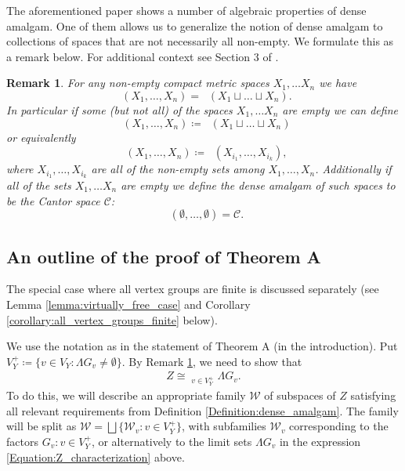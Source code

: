 \documentclass[12pt, a4paper]{article}
\newcommand{\8}{\infty}
\theoremstyle{break}
\newtheorem{rk}[thm]{Remark}
\theoremstyle{defbreak}
\DeclareMathOperator*{\damalgam}{\widetilde{\bigsqcup}}
\begin{document}
The aforementioned paper shows a number of algebraic properties of dense amalgam. One of them allows us to generalize the notion of dense amalgam to collections of spaces that are not necessarily all non-empty. We formulate this as a remark below. For additional context see Section $3$ of \cite{dense-amalgam}.\medskip

\begin{rk} \label{Remark:definition_of_dense_amalgam}
    For any non-empty compact metric spaces $X_1, \ldots X_n$ we have
    $$\damalgam(X_1,\ldots, X_n) = \damalgam(X_1\sqcup\ldots\sqcup X_n).$$
    In particular if some (but not all) of the spaces $X_1, \ldots X_n$ are empty we can define
    $$\damalgam(X_1,\ldots,X_n) \coloneqq \damalgam(X_1\sqcup\ldots\sqcup X_n)$$
    or equivalently 
    $$\damalgam(X_1,\ldots,X_n) \coloneqq \damalgam(X_{i_1},\ldots,X_{i_k}),$$
    where $X_{i_1},\ldots,X_{i_k}$ are all of the non-empty sets among $X_1,\ldots,X_n$. Additionally if all of the sets $X_1,\ldots X_n$ are empty we define the dense amalgam of such spaces to be the Cantor space $\mathcal{C}$:
    $$\damalgam(\emptyset,\ldots,\emptyset) = \mathcal{C}.$$
\end{rk}


\subsection{An outline of the proof of Theorem A}\label{Subsection:outline_of_proof}

The special case where all vertex groups are finite is discussed separately (see Lemma \ref{lemma:virtually_free_case} and Corollary  \ref{corollary:all_vertex_groups_finite} below). 


We use the notation as in the statement of Theorem A (in the introduction). Put $V_Y^+\coloneqq\{ v\in V_Y:\Lambda G_v\ne\emptyset \}$. By Remark \ref{Remark:definition_of_dense_amalgam},
we need to show that 
\begin{align}
Z\cong\damalgam_{v\in V_Y^+}\Lambda G_v. \label{Equation:Z_characterization}\tag{$*$}
\end{align}
To do this, we will describe an appropriate family $\mathcal{W}$
of subspaces of $Z$ satisfying all relevant requirements
from Definition \ref{Definition:dense_amalgam}. The family will be split as
$\mathcal{W}=\bigsqcup\{ \mathcal{W}_v:v\in V_Y^+ \}$,
with subfamilies $\mathcal{W}_v$ corresponding
to the factors $G_v:v\in V_Y^+$, or alternatively
to the limit sets $\Lambda G_v$ in the expression \eqref{Equation:Z_characterization} above.
\end{document}

